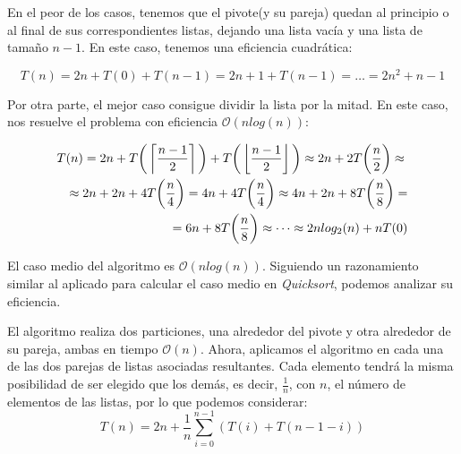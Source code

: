 \documentclass[a4paper, 11pt]{article} %
\begin{document}
      En el peor de los casos, tenemos que el pivote(y su pareja) quedan al principio o al final de sus correspondientes listas, dejando una lista vacía y una lista de tamaño $n-1$. En este caso, tenemos una eficiencia cuadrática:
      
	  \begin{equation}
	  	T(n) = 2n + T(0) + T(n-1) = 2n + 1 + T(n-1) = \dots = 2n^2 + n - 1
	  \end{equation}
      
      Por otra parte, el mejor caso consigue dividir la lista por la mitad. En este caso, nos resuelve el problema con eficiencia $\mathcal{O}(nlog(n))$:
      
	  \begin{eqnarray*}
	  \lefteqn{T(n) = 2n + T\bigg(\left\lceil \frac{n-1}{2} \right\rceil\bigg) + T\bigg(\left\lfloor \frac{n-1}{2}\right\rfloor\bigg) \approx 2n + 2T\bigg(\frac{n}{2}\bigg) \approx} \\
	  && \approx 2n + 2n + 4T\bigg(\frac{n}{4}\bigg) = 4n + 4T\bigg(\frac{n}{4}\bigg)\approx 4n + 2n + 8T\bigg(\frac{n}{8}\bigg) = \\ 
	  && = 6n + 8T\bigg(\frac{n}{8}\bigg) \approx \dots \approx 2nlog_2(n) + n T(0)
	  \end{eqnarray*}
	  
      El caso medio del algoritmo es $\mathcal{O}(nlog(n)) $. Siguiendo un razonamiento similar al aplicado para calcular el caso medio en \textit{Quicksort}, podemos analizar su eficiencia.
    
      El algoritmo realiza dos particiones, una alrededor del pivote y otra alrededor de su pareja, ambas en tiempo $\mathcal{O}(n)$. Ahora, aplicamos el algoritmo
      en cada una de las dos parejas de listas asociadas resultantes. Cada elemento tendrá la misma posibilidad de ser elegido que los demás, es decir, $\frac{1}{n}$,
      con $n$, el número de elementos de las listas, por lo que podemos considerar:
      \begin{equation}
		T(n) = 2n + \frac{1}{n}\sum_{i=0}^{n-1}\left(T(i) + T(n-1-i) \right)
      \end{equation}
      
\end{document}
